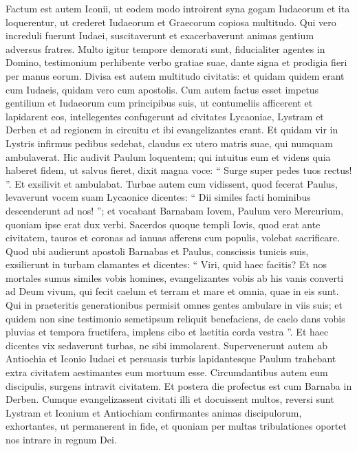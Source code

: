 \begin{biblechapter}
\begin{biblechapter}
\begin{biblechapter}
\begin{biblechapter}
\begin{biblechapter}
\begin{biblechapter}
\begin{biblechapter}
\begin{biblechapter}
\begin{biblechapter}
\begin{biblechapter}
\begin{biblechapter}
\begin{biblechapter}
\begin{biblechapter}
\begin{biblechapter}
\verse Factum est autem Iconii, ut eodem modo introirent syna gogam Iudaeorum et ita loquerentur, ut crederet Iudaeorum et Graecorum copiosa multitudo. 
\verse Qui vero increduli fuerunt Iudaei, suscitaverunt et exacerbaverunt animas gentium adversus fratres. 
\verse Multo igitur tempore demorati sunt, fiducialiter agentes in Domino, testimonium perhibente verbo gratiae suae, dante signa et prodigia fieri per manus eorum. 
\verse Divisa est autem multitudo civitatis: et quidam quidem erant cum Iudaeis, quidam vero cum apostolis. 
\verse Cum autem factus esset impetus gentilium et Iudaeorum cum principibus suis, ut contumeliis afficerent et lapidarent eos, 
\verse intellegentes confugerunt ad civitates Lycaoniae, Lystram et Derben et ad regionem in circuitu 
\verse et ibi evangelizantes erant.
 \verse Et quidam vir in Lystris infirmus pedibus sedebat, claudus ex utero matris suae, qui numquam ambulaverat. 
\verse Hic audivit Paulum loquentem; qui intuitus eum et videns quia haberet fidem, ut salvus fieret, 
\verse dixit magna voce: “ Surge super pedes tuos rectus! ”. Et exsilivit et ambulabat. 
\verse Turbae autem cum vidissent, quod fecerat Paulus, levaverunt vocem suam Lycaonice dicentes: “ Dii similes facti hominibus descenderunt ad nos! ”; 
\verse et vocabant Barnabam Iovem, Paulum vero Mercurium, quoniam ipse erat dux verbi.
 \verse Sacerdos quoque templi Iovis, quod erat ante civitatem, tauros et coronas ad ianuas afferens cum populis, volebat sacrificare. 
\verse Quod ubi audierunt apostoli Barnabas et Paulus, conscissis tunicis suis, exsilierunt in turbam clamantes 
\verse et dicentes: “ Viri, quid haec facitis? Et nos mortales sumus similes vobis homines, evangelizantes vobis ab his vanis converti ad Deum vivum, qui fecit caelum et terram et mare et omnia, quae in eis sunt. 
\verse Qui in praeteritis generationibus permisit omnes gentes ambulare in viis suis; 
\verse et quidem non sine testimonio semetipsum reliquit benefaciens, de caelo dans vobis pluvias et tempora fructifera, implens cibo et laetitia corda vestra ”. 
 \verse Et haec dicentes vix sedaverunt turbas, ne sibi immolarent. 
\verse Supervenerunt autem ab Antiochia et Iconio Iudaei et persuasis turbis lapidantesque Paulum trahebant extra civitatem aestimantes eum mortuum esse. 
 \verse Circumdantibus autem eum discipulis, surgens intravit civitatem. Et postera die profectus est cum Barnaba in Derben.
 \verse Cumque evangelizassent civitati illi et docuissent multos, reversi sunt Lystram et Iconium et Antiochiam 
\verse confirmantes animas discipulorum, exhortantes, ut permanerent in fide, et quoniam per multas tribulationes oportet nos intrare in regnum Dei. 

\end{biblechapter}
\end{biblechapter}
\end{biblechapter}
\end{biblechapter}
\end{biblechapter}
\end{biblechapter}
\end{biblechapter}
\end{biblechapter}
\end{biblechapter}
\end{biblechapter}
\end{biblechapter}
\end{biblechapter}
\end{biblechapter}
\end{biblechapter}
